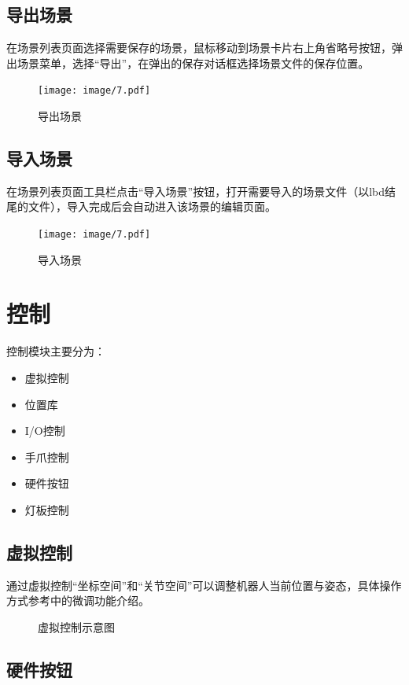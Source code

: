 \subsection{导出场景}
在场景列表页面选择需要保存的场景，鼠标移动到场景卡片右上角省略号按钮，弹出场景菜单，选择“导出”，在弹出的保存对话框选择场景文件的保存位置。

\begin{figure}[ht]
	\centering
	\texttt{[image: image/7.pdf]}
	\caption{导出场景}
	\label{fig:导出场景}
\end{figure}

\subsection{导入场景}
在场景列表页面工具栏点击“导入场景”按钮，打开需要导入的场景文件（以lbd结尾的文件），导入完成后会自动进入该场景的编辑页面。

\begin{figure}[ht]
	\centering
	\texttt{[image: image/7.pdf]}
	\caption{导入场景}
	\label{fig:导入场景}
\end{figure}

\section{控制}
控制模块主要分为：
\begin{itemize}
\item 虚拟控制
\item 位置库
\item I/O控制
\item 手爪控制
\item 硬件按钮
\item 灯板控制
\end{itemize}

\subsection{虚拟控制}
通过虚拟控制“坐标空间”和“关节空间”可以调整机器人当前位置与姿态，具体操作方式参考中的微调功能介绍。

\begin{figure}[ht]
	\centering
	\color{red}{缺图}
	\caption{虚拟控制示意图}
	\label{fig:虚拟控制示意图}
\end{figure}

\subsection{硬件按钮}

